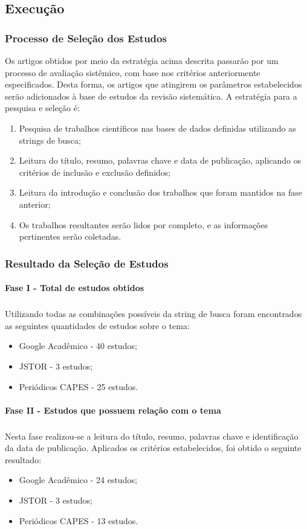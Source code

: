 \subsection{Execução}
\subsubsection{Processo de Seleção dos Estudos}
\quad Os artigos obtidos por meio da estratégia acima descrita passarão por um processo de avaliação sistêmico, com base nos critérios anteriormente especificados.
Desta forma, os artigos que atingirem os parâmetros estabelecidos serão adicionados à base de estudos da revisão sistemática. A estratégia para a pesquisa e seleção é:
\begin{enumerate}
  \item Pesquisa de trabalhos científicos nas bases de dados definidas utilizando as strings de busca;
  \item Leitura do título, resumo, palavras chave e data de publicação, aplicando os critérios de inclusão e exclusão definidos;
  \item Leitura da introdução e conclusão dos trabalhos que foram mantidos na fase anterior;
  \item Os trabalhos resultantes serão lidos por completo, e as informações pertinentes serão coletadas.
\end{enumerate}

\subsubsection{Resultado da Seleção de Estudos}
\paragraph{Fase I - Total de estudos obtidos}
\subparagraph{}
\quad Utilizando todas as combinações possíveis da string de busca foram encontrados as seguintes quantidades de estudos sobre o tema:
\begin{itemize}
  \item Google Acadêmico - 40 estudos;
  \item JSTOR - 3 estudos;
  \item Periódicos CAPES - 25 estudos.
\end{itemize}
\paragraph{Fase II - Estudos que possuem relação com o tema}
\subparagraph{}
\quad Nesta fase realizou-se a leitura do título, resumo, palavras chave e identificação da data de publicação.
Aplicados os critérios estabelecidos, foi obtido o seguinte resultado:
\begin{itemize}
  \item Google Acadêmico - 24 estudos;
  \item JSTOR - 3 estudos;
  \item Periódicos CAPES - 13 estudos.
\end{itemize}
